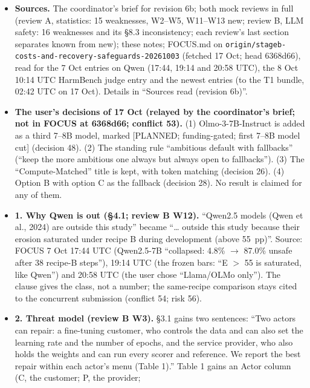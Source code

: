 \documentclass{article}
\theoremstyle{plain}
\theoremstyle{definition}
\theoremstyle{remark}
\begin{document}
\begin{itemize}
  \item \textbf{Sources.} The coordinator's brief for revision 6b; both mock
        reviews in full (review A, statistics: 15 weaknesses, W2--W5, W11--W13
        new; review B, LLM safety: 16 weaknesses and its \S{}8.3 inconsistency;
        each review's last section separates known from new); these notes;
        FOCUS.md on
        \nolinkurl{origin/stageb-costs-and-recovery-safeguards-20261003}
        (fetched 17 Oct; head 6368d66), read for the 7 Oct entries on Qwen
        (17:44, 19:14 and 20:58 UTC), the 8 Oct 10:14 UTC HarmBench judge entry
        and the newest entries (to the T1 bundle, 02:42 UTC on 17 Oct). Details
        in ``Sources read (revision 6b)''.
  \item \textbf{The user's decisions of 17 Oct (relayed by the coordinator's
        brief; not in FOCUS at 6368d66; conflict 53).} (1) Olmo-3-7B-Instruct is
        added as a third 7--8B model, marked [PLANNED; funding-gated; first
        7--8B model cut] (decision 48). (2) The standing rule ``ambitious
        default with fallbacks'' (``keep the more ambitious one always but
        always open to fallbacks''). (3) The ``Compute-Matched'' title is kept,
        with token matching (decision 26). (4) Option B with option C as the
        fallback (decision 28). No result is claimed for any of them.
  \item \textbf{1. Why Qwen is out (\S{}4.1; review B W12).} ``Qwen2.5 models
        (Qwen et al., 2024) are outside this study'' became ``\ldots{} outside
        this study because their erosion saturated under recipe B during
        development (above 55~pp)''. Source: FOCUS 7 Oct 17:44 UTC (Qwen2.5-7B
        ``collapsed: 4.8\% $\to$ 87.0\% unsafe after 38 recipe-B steps''), 19:14
        UTC (the frozen bars: ``E $>$ 55 is saturated, like Qwen'') and 20:58
        UTC (the user chose ``Llama/OLMo only''). The clause gives the class,
        not a number; the same-recipe comparison stays cited to the concurrent
        submission (conflict 54; risk 56).
  \item \textbf{2. Threat model (review B W3).} \S{}3.1 gains two sentences:
        ``Two actors can repair: a fine-tuning customer, who controls the data
        and can also set the learning rate and the number of epochs, and the
        service provider, who also holds the weights and can run every scorer
        and reference. We report the best repair within each actor's menu (Table
        1).'' Table 1 gains an Actor column (C, the customer; P, the provider;

\end{itemize}
\end{document}

